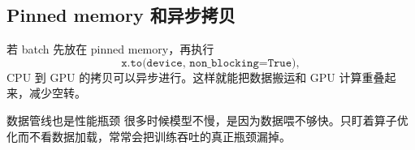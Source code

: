 \subsection{Pinned memory 和异步拷贝}

若 batch 先放在 pinned memory，再执行
\[
\texttt{x.to(device, non\_blocking=True)},
\]
CPU 到 GPU 的拷贝可以异步进行。这样就能把数据搬运和 GPU 计算重叠起来，减少空转。

\begin{warningbox}{数据管线也是性能瓶颈}
很多时候模型不慢，是因为数据喂不够快。只盯着算子优化而不看数据加载，常常会把训练吞吐的真正瓶颈漏掉。
\end{warningbox}


